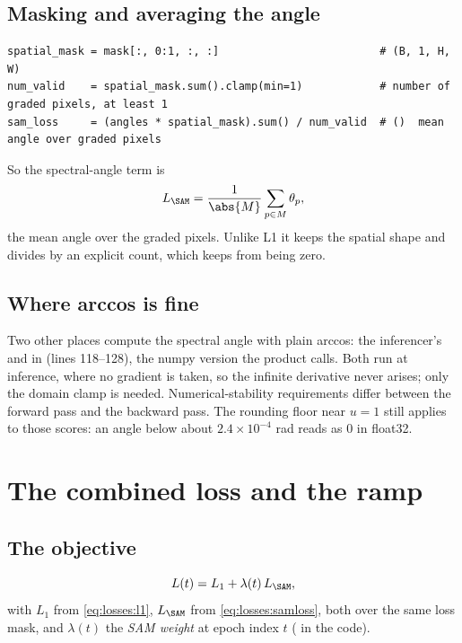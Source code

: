 \subsection{Masking and averaging the angle}

\begin{lstlisting}
spatial_mask = mask[:, 0:1, :, :]                         # (B, 1, H, W)
num_valid    = spatial_mask.sum().clamp(min=1)            # number of graded pixels, at least 1
sam_loss     = (angles * spatial_mask).sum() / num_valid  # ()  mean angle over graded pixels
\end{lstlisting}
So the spectral-angle term is
\begin{equation}\label{eq:losses:samloss}
L_{\SAM} = \frac{1}{\abs{M}}\sum_{p \in M} \theta_p,
\end{equation}
the mean angle over the graded pixels. Unlike L1 it keeps the spatial shape and divides by an
explicit count, which  keeps from being zero.

\subsection{Where arccos is fine}

Two other places compute the spectral angle with plain arccos: the inferencer's
 and  in
 (lines 118--128), the numpy version the product
calls. Both run at inference, where no gradient is taken, so the infinite derivative never
arises; only the domain clamp  is needed. Numerical-stability
requirements differ between the forward pass and the backward pass. The rounding floor near
$u = 1$ still applies to those scores: an angle below about $2.4 \times 10^{-4}$ rad reads as 0
in float32.

\section{The combined loss and the ramp}\label{sec:losses:ramp}

\subsection{The objective}

\begin{definition}
\begin{equation}\label{eq:losses:total}
L(t) = L_1 + \lambda(t)\, L_{\SAM},
\end{equation}
with $L_1$ from \cref{eq:losses:l1}, $L_{\SAM}$ from \cref{eq:losses:samloss}, both over the
same loss mask, and $\lambda(t)$ the \emph{SAM weight} at epoch index $t$
( in the code).
\end{definition}

